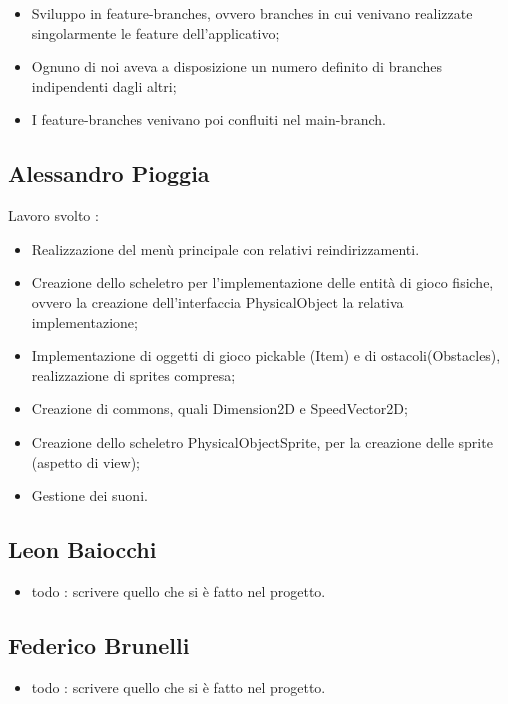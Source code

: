 \begin{itemize}
	\item Sviluppo in feature-branches, ovvero branches in cui venivano realizzate singolarmente le feature dell'applicativo;
	\item Ognuno di noi aveva a disposizione un numero definito di branches indipendenti dagli altri;
	\item I feature-branches venivano poi confluiti nel main-branch.
\end{itemize}

\subsection*{Alessandro Pioggia}
Lavoro svolto : 
\begin{itemize}
	\item Realizzazione del menù principale con relativi reindirizzamenti.
	\item Creazione dello scheletro per l'implementazione delle entità di gioco fisiche, ovvero la creazione dell'interfaccia PhysicalObject la relativa implementazione;
	\item Implementazione di oggetti di gioco pickable (Item) e di ostacoli(Obstacles), realizzazione di sprites compresa;
	\item Creazione di commons, quali Dimension2D e SpeedVector2D;
	\item Creazione dello scheletro PhysicalObjectSprite, per la creazione delle sprite (aspetto di view);
	\item Gestione dei suoni.
\end{itemize}


\subsection*{Leon Baiocchi}

\begin{itemize}
	\item  todo : scrivere quello che si è fatto nel progetto.
\end{itemize}

\subsection*{Federico Brunelli}

\begin{itemize}
	\item  todo : scrivere quello che si è fatto nel progetto.
\end{itemize}

